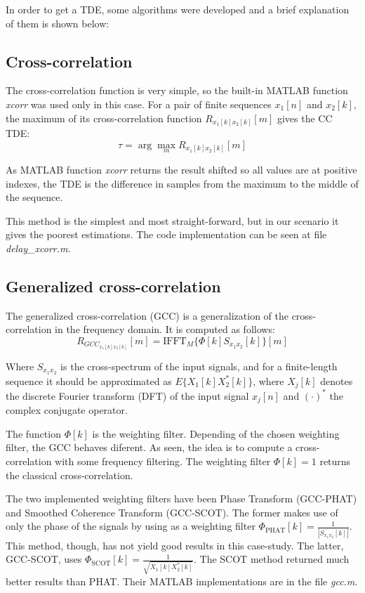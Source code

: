 In order to get a TDE, some algorithms were developed and a brief explanation of them is shown below:

\subsection{Cross-correlation}
  The cross-correlation function is very simple, so the built-in MATLAB function \emph{xcorr} was used only in this case. For a pair of finite sequences $x_1[n]$ and $x_2[k]$, the maximum of its cross-correlation function $R_{x_1[k] x_2[k]}[m]$ gives the CC TDE:
  \begin{dmath}
    \tau = \arg\max_m R_{x_1[k] x_2[k]}[m]
  \end{dmath}
  
  As MATLAB function \emph{xcorr} returns the result shifted so all values are at positive indexes, the TDE is the difference in samples from the maximum to the middle of the sequence.
  
  This method is the simplest and most straight-forward, but in our scenario it gives the poorest estimations. The code implementation can be seen at file \emph{delay\_xcorr.m}\cite{delayxcorr.m}.
  

\subsection{Generalized cross-correlation}
The generalized cross-correlation (GCC) is a generalization of the cross-correlation in the frequency domain. It is computed as follows:
\begin{dmath}
  R_{GCC_{x_1[k] x_2[k]}}[m] = \text{IFFT}_M\{\Phi[k]S_{x_1x_2}[k]\}[m]
\end{dmath}

Where $S_{x_1x_2}$ is the cross-spectrum of the input signals, and for a finite-length sequence it should be approximated as $E\{X_1[k]X^*_2[k]\} $, where $X_j[k]$ denotes the discrete Fourier transform (DFT) of the input signal $x_j[n]$ and $(\cdotp)^*$ the complex conjugate operator.

The function $\Phi[k]$ is the weighting filter. Depending of the chosen weighting filter, the GCC behaves diferent. As seen, the idea is to compute a cross-correlation with some frequency filtering. The weighting filter $\Phi[k]=1$ returns the classical cross-correlation.

The two implemented weighting filters have been Phase Transform (GCC-PHAT) and Smoothed Coherence Transform (GCC-SCOT). The former makes use of only the phase of the signals by using as a weighting filter $\Phi_{\text{PHAT}}[k]=\frac{1}{|S_{x_1x_2}[k]|}$. This method, though, has not yield good results in this case-study. The latter, GCC-SCOT, uses $\Phi_{\text{SCOT}}[k]=\frac{1}{\sqrt{X_1[k]X^*_2[k]}}$. The SCOT method returned much better results than PHAT. Their MATLAB implementations are in the file \emph{gcc.m}\cite{gcc.m}.

